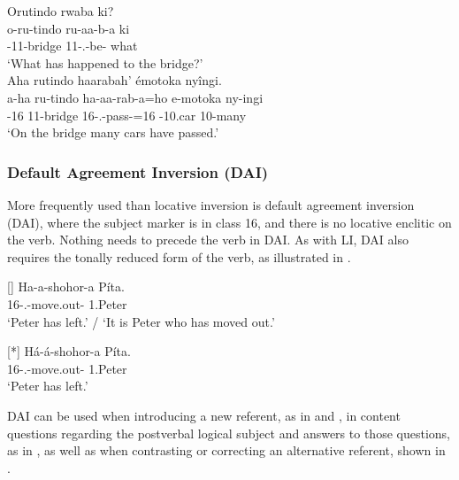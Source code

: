 \documentclass[output=paper]{langscibook}
\begin{document}
\ex
\label{bkm:Ref111455300:b}
Orutindo rwaba ki?\\
\gll
o-ru-tindo  ru-aa-b-a  ki\\
\AUG{}-11-bridge  11\SM{}-\N{}.\PST{}-be-\FV{}  what\\
\glt
‘What has happened to the bridge?’\\


\ex
\label{bkm:Ref111455300:c}
Aha rutindo haarabah’ émotoka nyîngi.\\
\gll
a-ha  ru-tindo  ha-aa-rab-a=ho  e-motoka  ny-ingi\\
\AUG{}-16  11-bridge  16\SM{}-\N{}.\PST{}-pass-\FV{}=16  \AUG{}-10.car  10-many\\
\glt
‘On the bridge many cars have passed.’\\


\z
\z

\subsubsection{Default Agreement Inversion (DAI)}
\label{bkm:Ref116291412}
More frequently used than locative inversion is default agreement inversion (DAI), where the subject marker is in class 16, and there is no locative enclitic on the verb. Nothing needs to precede the verb in DAI. As with LI, DAI also requires the tonally reduced form of the verb, as illustrated in .

\ea
\label{bkm:Ref116293644}
\ea
[]{
{\gll
Ha-a-shohor-a  Píta.  \\
16\SM{}-\N{}.\PST{}-move.out-\FV{}  1.Peter\\
}\jambox*{[with TR]}
\glt
‘Peter has left.’ / ‘It is Peter who has moved out.’\\
}


\ex
[*]{
{\gll
Há-á-shohor-a  Píta.  \\
16\SM{}-\N{}.\PST{}-move.out-\FV{}  1.Peter\\
}\jambox*{[no TR]}
\glt
‘Peter has left.’\\
}


\z
\z

DAI can be used when introducing a new referent, as in  and , in content questions regarding the postverbal logical subject and answers to those questions, as in , as well as when contrasting or correcting an alternative referent, shown in .\pagebreak
\end{document}
